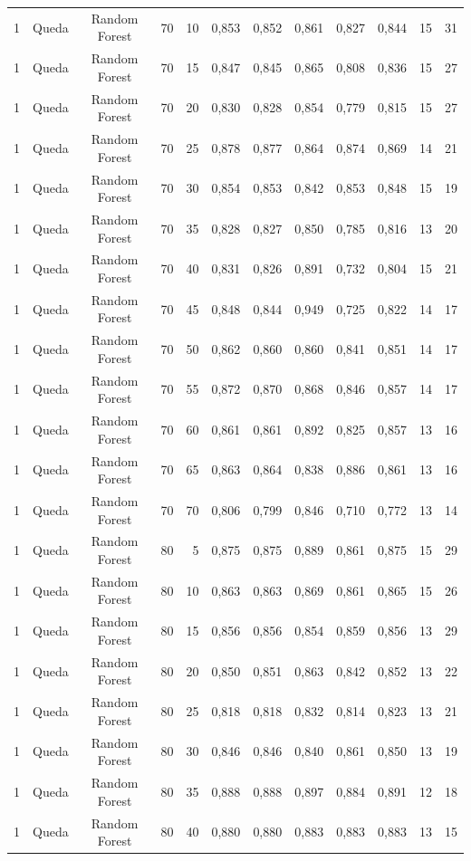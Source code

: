 \begin{longtable}{ccclrrrrrrrr}
1 & Queda & Random Forest & 70 & 10 & 0,853 & 0,852 & 0,861 & 0,827 & 0,844 & 15 & 31 \\
1 & Queda & Random Forest & 70 & 15 & 0,847 & 0,845 & 0,865 & 0,808 & 0,836 & 15 & 27 \\
1 & Queda & Random Forest & 70 & 20 & 0,830 & 0,828 & 0,854 & 0,779 & 0,815 & 15 & 27 \\
1 & Queda & Random Forest & 70 & 25 & 0,878 & 0,877 & 0,864 & 0,874 & 0,869 & 14 & 21 \\
1 & Queda & Random Forest & 70 & 30 & 0,854 & 0,853 & 0,842 & 0,853 & 0,848 & 15 & 19 \\
1 & Queda & Random Forest & 70 & 35 & 0,828 & 0,827 & 0,850 & 0,785 & 0,816 & 13 & 20 \\
1 & Queda & Random Forest & 70 & 40 & 0,831 & 0,826 & 0,891 & 0,732 & 0,804 & 15 & 21 \\
1 & Queda & Random Forest & 70 & 45 & 0,848 & 0,844 & 0,949 & 0,725 & 0,822 & 14 & 17 \\
1 & Queda & Random Forest & 70 & 50 & 0,862 & 0,860 & 0,860 & 0,841 & 0,851 & 14 & 17 \\
1 & Queda & Random Forest & 70 & 55 & 0,872 & 0,870 & 0,868 & 0,846 & 0,857 & 14 & 17 \\
1 & Queda & Random Forest & 70 & 60 & 0,861 & 0,861 & 0,892 & 0,825 & 0,857 & 13 & 16 \\
1 & Queda & Random Forest & 70 & 65 & 0,863 & 0,864 & 0,838 & 0,886 & 0,861 & 13 & 16 \\
1 & Queda & Random Forest & 70 & 70 & 0,806 & 0,799 & 0,846 & 0,710 & 0,772 & 13 & 14 \\
1 & Queda & Random Forest & 80 & 5 & 0,875 & 0,875 & 0,889 & 0,861 & 0,875 & 15 & 29 \\
1 & Queda & Random Forest & 80 & 10 & 0,863 & 0,863 & 0,869 & 0,861 & 0,865 & 15 & 26 \\
1 & Queda & Random Forest & 80 & 15 & 0,856 & 0,856 & 0,854 & 0,859 & 0,856 & 13 & 29 \\
1 & Queda & Random Forest & 80 & 20 & 0,850 & 0,851 & 0,863 & 0,842 & 0,852 & 13 & 22 \\
1 & Queda & Random Forest & 80 & 25 & 0,818 & 0,818 & 0,832 & 0,814 & 0,823 & 13 & 21 \\
1 & Queda & Random Forest & 80 & 30 & 0,846 & 0,846 & 0,840 & 0,861 & 0,850 & 13 & 19 \\
1 & Queda & Random Forest & 80 & 35 & 0,888 & 0,888 & 0,897 & 0,884 & 0,891 & 12 & 18 \\
1 & Queda & Random Forest & 80 & 40 & 0,880 & 0,880 & 0,883 & 0,883 & 0,883 & 13 & 15 \\

\end{longtable}
